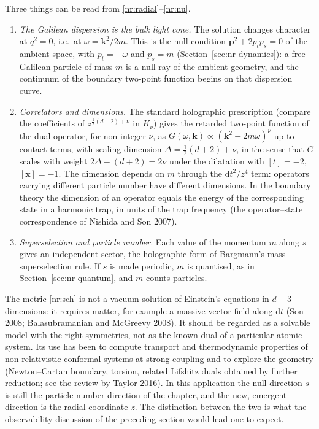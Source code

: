 Three things can be read from \eqref{nr:radial}--\eqref{nr:nu}.
\begin{enumerate}
\item \emph{The Galilean dispersion is the bulk light cone.} The solution changes
character at $q^2=0$, i.e.\ at $\omega=\mathbf{k}^2/2m$. This is the null
condition $\mathbf{p}^2+2p_tp_s=0$ of the ambient space, with $p_t=-\omega$ and
$p_s=m$ (Section~\ref{sec:nr-dynamics}): a free Galilean particle of mass $m$ is a null
ray of the ambient geometry, and the continuum of the boundary two-point
function begins on that dispersion curve.
\item \emph{Correlators and dimensions.} The standard holographic prescription
(compare the coefficients of $z^{\frac12(d+2)\mp\nu}$ in $K_\nu$) gives the
retarded two-point function of the dual operator, for non-integer $\nu$, as
$G(\omega,\mathbf{k})\propto(\mathbf{k}^2-2m\omega)^{\nu}$ up to contact terms,
with scaling dimension
$\Delta=\tfrac12(d+2)+\nu$, in the sense that
$G$ scales with weight $2\Delta-(d+2)=2\nu$ under the dilatation with $[t]=-2$,
$[\mathbf{x}]=-1$. The dimension depends on $m$ through the $\mathrm{d}t^2/z^4$ term:
operators carrying different particle number have different dimensions. In
the boundary theory the dimension of an operator equals the energy of the
corresponding state in a harmonic trap, in units of the trap frequency (the
operator--state correspondence of Nishida and Son 2007).
\item \emph{Superselection and particle number.} Each value of the momentum
$m$ along $s$ gives an independent sector, the holographic form of Bargmann's mass
superselection rule. If $s$ is made periodic, $m$ is quantised, as in
Section~\ref{sec:nr-quantum}, and $m$ counts particles.
\end{enumerate}

\begin{nrrem}
The metric \eqref{nr:sch} is not a vacuum solution of Einstein's equations in
$d+3$ dimensions: it requires matter, for example a massive vector field
along $\mathrm{d}t$ (Son 2008; Balasubramanian and McGreevy 2008). It should be
regarded as a solvable model with the right symmetries, not as the known dual of
a particular atomic system. Its use has been to compute
transport and thermodynamic properties of non-relativistic conformal
systems at strong coupling and to explore the geometry (Newton--Cartan
boundary, torsion, related Lifshitz duals obtained by further reduction; see
the review by Taylor 2016). In this application the null direction $s$ is still the
particle-number direction of the chapter, and the new, emergent
direction is the radial coordinate $z$. The distinction between the two is
what the observability discussion of the preceding section would
lead one to expect.
\end{nrrem}

